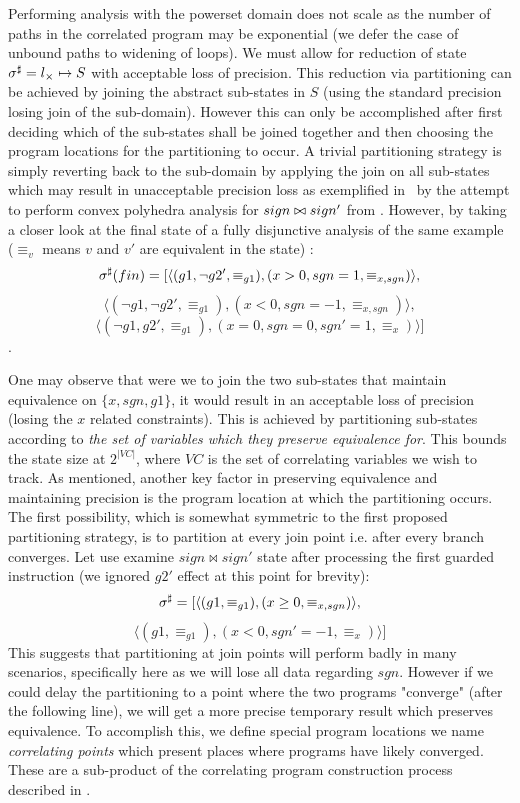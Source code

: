 Performing analysis with the powerset domain does not scale as the number of paths in the correlated program may be exponential (we defer the case of unbound paths to widening of loops). We must allow for reduction of state $\sigma^\sharp = l_{\times} \mapsto S$ with acceptable loss of precision. This reduction via partitioning can be achieved by joining the abstract sub-states in $S$ (using the standard precision losing join of the sub-domain). However this can only be accomplished after first deciding which of the sub-states shall be joined together and then choosing the program locations for the partitioning to occur. A trivial partitioning strategy is simply reverting back to the sub-domain by applying the join on all sub-states which may result in unacceptable precision loss as exemplified in~ by the attempt to perform convex polyhedra analysis for $sign \bowtie sign'$ from . However, by taking a closer look at the final state of a fully disjunctive analysis of the same example ($\equiv_{v}$ means $v$ and $v'$ are equivalent in the state) :
{\footnotesize
\[
\sigma^\sharp(fin) = [ \langle (g1,\neg g2',\equiv_{g1}),(x>0,sgn=1,\equiv_{x,sgn}) \rangle,
\]
\[
\langle (\neg g1,\neg g2',\equiv_{g1}), (x<0,sgn=-1,\equiv_{x,sgn}) \rangle,
\]
\[
\langle (\neg g1,g2',\equiv_{g1}),(x=0,sgn=0,sgn'=1,\equiv_{x}) \rangle ]
\]
}.

One may observe that were we to join the two sub-states that maintain equivalence on $\{x,sgn,g1\}$, it would result in an acceptable loss of precision (losing the $x$ related constraints). This is achieved by partitioning sub-states according to \emph{the set of variables which they preserve equivalence for}. This bounds the state size at $2^{|VC|}$, where $VC$ is the set of correlating variables we wish to track.
As mentioned, another key factor in preserving equivalence and maintaining precision is the program location at which the partitioning occurs. The first possibility, which is somewhat symmetric to the first proposed partitioning strategy, is to partition at every join point i.e. after every branch converges. Let use examine $sign \bowtie sign'$ state after processing the first guarded instruction  (we ignored $g2'$ effect at this point for brevity):
{\footnotesize
\[
\sigma^\sharp = [ \langle (g1,\equiv_{g1}),(x \geq 0,\equiv_{x,sgn}) \rangle,
\]
\[
\langle (g1,\equiv_{g1}),(x < 0,sgn' = -1, \equiv_{x}) \rangle ]
\]
}
This suggests that partitioning at join points will perform badly in many scenarios, specifically here as we will lose all data regarding $sgn$. However if we could delay the partitioning to a point where the two programs "converge" (after the following  line), we will get a more precise temporary result which preserves equivalence. To accomplish this, we define special program locations we name \emph{correlating points} which present places where programs have likely converged. These are a sub-product of the correlating program construction process described in .

